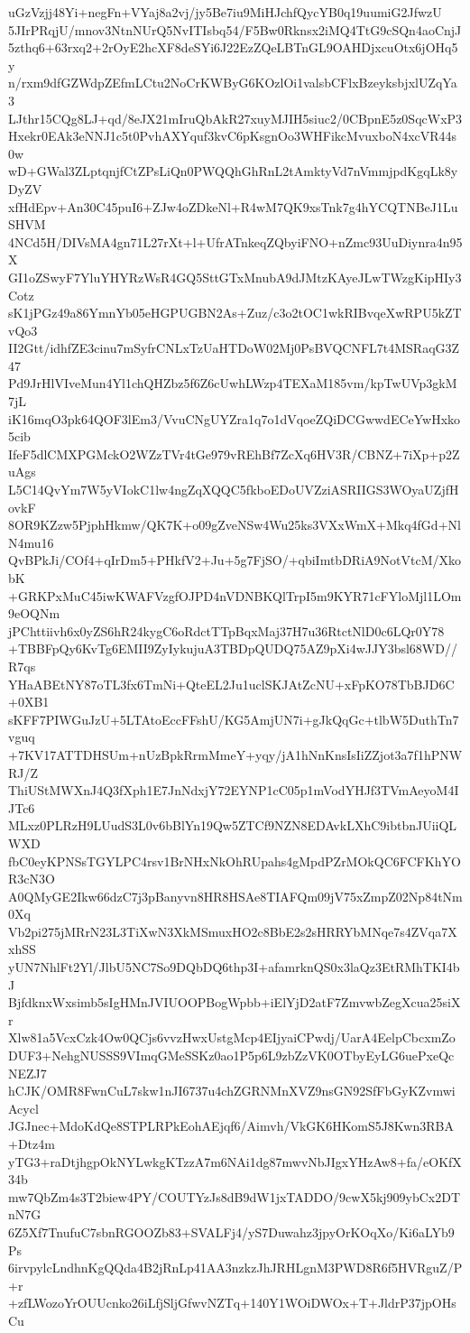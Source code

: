 uGzVzjj48Yi+negFn+VYaj8a2vj/jy5Be7iu9MiHJchfQycYB0q19uumiG2JfwzU
5JIrPRqjU/mnov3NtnNUrQ5NvITIsbq54/F5Bw0Rknsx2iMQ4TtG9cSQn4aoCnjJ
5zthq6+63rxq2+2rOyE2hcXF8deSYi6J22EzZQeLBTnGL9OAHDjxcuOtx6jOHq5y
n/rxm9dfGZWdpZEfmLCtu2NoCrKWByG6KOzlOi1valsbCFlxBzeyksbjxlUZqYa3
LJthr15CQg8LJ+qd/8eJX21mIruQbAkR27xuyMJIH5siuc2/0CBpnE5z0SqcWxP3
Hxekr0EAk3eNNJ1c5t0PvhAXYquf3kvC6pKsgnOo3WHFikcMvuxboN4xcVR44s0w
wD+GWal3ZLptqnjfCtZPsLiQn0PWQQhGhRnL2tAmktyVd7nVmmjpdKgqLk8yDyZV
xfHdEpv+An30C45puI6+ZJw4oZDkeNl+R4wM7QK9xsTnk7g4hYCQTNBeJ1LuSHVM
4NCd5H/DIVsMA4gn71L27rXt+l+UfrATnkeqZQbyiFNO+nZmc93UuDiynra4n95X
GI1oZSwyF7YluYHYRzWsR4GQ5SttGTxMnubA9dJMtzKAyeJLwTWzgKipHIy3Cotz
sK1jPGz49a86YmnYb05eHGPUGBN2As+Zuz/c3o2tOC1wkRIBvqeXwRPU5kZTvQo3
II2Gtt/idhfZE3cinu7mSyfrCNLxTzUaHTDoW02Mj0PsBVQCNFL7t4MSRaqG3Z47
Pd9JrHlVIveMun4Yl1chQHZbz5f6Z6cUwhLWzp4TEXaM185vm/kpTwUVp3gkM7jL
iK16mqO3pk64QOF3lEm3/VvuCNgUYZra1q7o1dVqoeZQiDCGwwdECeYwHxko5cib
IfeF5dlCMXPGMckO2WZzTVr4tGe979vREhBf7ZcXq6HV3R/CBNZ+7iXp+p2ZuAgs
L5C14QvYm7W5yVIokC1lw4ngZqXQQC5fkboEDoUVZziASRIIGS3WOyaUZjfHovkF
8OR9KZzw5PjphHkmw/QK7K+o09gZveNSw4Wu25ks3VXxWmX+Mkq4fGd+NlN4mu16
QvBPkJi/COf4+qIrDm5+PHkfV2+Ju+5g7FjSO/+qbiImtbDRiA9NotVtcM/XkobK
+GRKPxMuC45iwKWAFVzgfOJPD4nVDNBKQlTrpI5m9KYR71cFYloMjl1LOm9eOQNm
jPChttiivh6x0yZS6hR24kygC6oRdctTTpBqxMaj37H7u36RtctNlD0c6LQr0Y78
+TBBFpQy6KvTg6EMII9ZyIykujuA3TBDpQUDQ75AZ9pXi4wJJY3bsl68WD//R7qs
YHaABEtNY87oTL3fx6TmNi+QteEL2Ju1uclSKJAtZcNU+xFpKO78TbBJD6C+0XB1
sKFF7PIWGuJzU+5LTAtoEccFFshU/KG5AmjUN7i+gJkQqGc+tlbW5DuthTn7vguq
+7KV17ATTDHSUm+nUzBpkRrmMmeY+yqy/jA1hNnKnsIsIiZZjot3a7f1hPNWRJ/Z
ThiUStMWXnJ4Q3fXph1E7JnNdxjY72EYNP1cC05p1mVodYHJf3TVmAeyoM4IJTc6
MLxz0PLRzH9LUudS3L0v6bBlYn19Qw5ZTCf9NZN8EDAvkLXhC9ibtbnJUiiQLWXD
fbC0eyKPNSsTGYLPC4rsv1BrNHxNkOhRUpahs4gMpdPZrMOkQC6FCFKhYOR3cN3O
A0QMyGE2Ikw66dzC7j3pBanyvn8HR8HSAe8TIAFQm09jV75xZmpZ02Np84tNm0Xq
Vb2pi275jMRrN23L3TiXwN3XkMSmuxHO2c8BbE2s2sHRRYbMNqe7s4ZVqa7XxhSS
yUN7NhlFt2Yl/JlbU5NC7So9DQbDQ6thp3I+afamrknQS0x3laQz3EtRMhTKI4bJ
BjfdknxWxsimb5sIgHMnJVIUOOPBogWpbb+iElYjD2atF7ZmvwbZegXcua25siXr
Xlw81a5VcxCzk4Ow0QCjs6vvzHwxUstgMcp4EIjyaiCPwdj/UarA4EelpCbcxmZo
DUF3+NehgNUSSS9VImqGMeSSKz0ao1P5p6L9zbZzVK0OTbyEyLG6uePxeQcNEZJ7
hCJK/OMR8FwnCuL7skw1nJI6737u4chZGRNMnXVZ9nsGN92SfFbGyKZvmwiAcycl
JGJnec+MdoKdQe8STPLRPkEohAEjqf6/Aimvh/VkGK6HKomS5J8Kwn3RBA+Dtz4m
yTG3+raDtjhgpOkNYLwkgKTzzA7m6NAi1dg87mwvNbJIgxYHzAw8+fa/eOKfX34b
mw7QbZm4s3T2biew4PY/COUTYzJs8dB9dW1jxTADDO/9cwX5kj909ybCx2DTnN7G
6Z5Xf7TnufuC7sbnRGOOZb83+SVALFj4/yS7Duwahz3jpyOrKOqXo/Ki6aLYb9Ps
6irvpylcLndhnKgQQda4B2jRnLp41AA3nzkzJhJRHLgnM3PWD8R6f5HVRguZ/P+r
+zfLWozoYrOUUcnko26iLfjSljGfwvNZTq+140Y1WOiDWOx+T+JldrP37jpOHsCu
